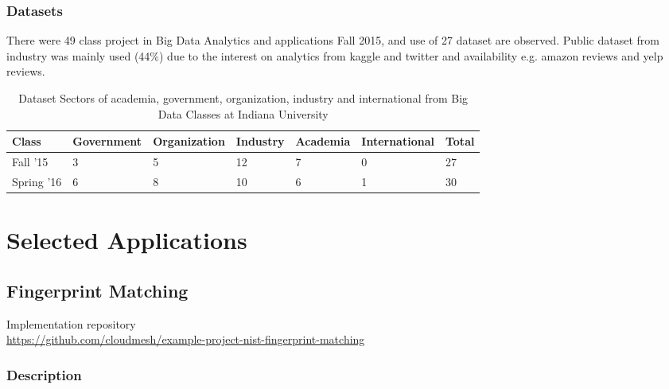 \documentclass[9pt,twocolumn,twoside]{styles/osajnl}
\begin{document}
\subsubsection{Datasets}

There were 49 class project in Big Data Analytics and applications Fall 2015,
and use of 27 dataset are observed. Public dataset from industry was mainly
used (44\%) due to the interest on analytics from kaggle and twitter and
availability e.g. amazon reviews and yelp reviews.

\begin{table}[htb]
  \begin{center}
    \begin{small}
      \begin{tabular}{l|l|l|l|l|l|l}
    Class      & Government & Organization & Industry & Academia & International & Total \\ \hline \hline
    Fall '15   & 3          & 5            & 12       & 7        & 0             & 27    \\ \hline
    Spring '16 & 6          & 8            & 10       & 6        & 1             & 30    \\ \hline
      \end{tabular}
      \caption{Dataset Sectors of academia, government, organization,
        industry and international from Big Data Classes at Indiana
        University}
      \label{tab:dataset-sector-iu}
    \end{small}
  \end{center}
\end{table}



\section{Selected Applications}

\subsection{Fingerprint Matching}

Implementation repository\\
\url{https://github.com/cloudmesh/example-project-nist-fingerprint-matching}

\subsubsection{Description}
\end{document}
